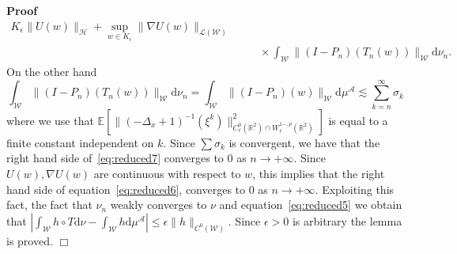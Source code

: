 \documentclass[a4paper,10pt]{article}
\newcommand{\mathd}{\mathrm{d}}
\newenvironment{proof}{\noindent\textbf{Proof\ }}{\hspace*{\fill}$\Box$\medskip}
\begin{document}
\begin{proof}
\begin{eqnarray}
{    K_{\epsilon}} \| U (w) \|_{\mathcal{H}} + \sup_{w \in K_{\epsilon}} \|
    \nabla U (w) \|_{\mathcal{L} (\mathcal{W})} \nonumber\\
    &  & \quad \times \int_{\mathcal{W}} \| (I - P_n) (T_n (w))
    \|_{\mathcal{W}} \mathd \nu_n .  \label{eq:reduced6}
  \end{eqnarray}
  On the other hand
  \begin{equation}
    \int_{\mathcal{W}} \| (I - P_n) (T_n (w)) \|_{\mathcal{W}} \mathd \nu_n =
    \int_{\mathcal{W}} \| (I - P_n) (w) \|_{\mathcal{W}} \mathd
    \mu^{\mathcal{A}} \lesssim \sum_{k = n}^{\infty} \sigma_k
    \label{eq:reduced7}
  \end{equation}
  where we use that $\mathbb{E} [\| (- \Delta_x + 1)^{- 1} (\xi^k)
  \|^2_{C^0_{\ell} (\mathbb{R}^2) \cap W^{1 -, p}_{\ell} (\mathbb{R}^2)}]$ is
  equal to a finite constant independent on $k$. Since $\sum \sigma_k$ is
  convergent, we have that the right hand side of~{\eqref{eq:reduced7}}
  converges to 0 as $n \rightarrow + \infty$. Since $U (w), \nabla U (w)$ are
  continuous with respect to $w$, this implies that the right hand side of
  equation~{\eqref{eq:reduced6}}, converges to 0 as $n \rightarrow + \infty$.
  Exploiting this fact, the fact that $\nu_n$ weakly converges to $\nu$ and
  equation~{\eqref{eq:reduced5}} we obtain that $\left| \int_{\mathcal{W}} h
  \circ T \mathd \nu - \int_{\mathcal{W}} h \mathd \mu^{\mathcal{A}} \right|
  \leqslant \epsilon \| h \|_{C^0 (\mathcal{W})}$. Since $\epsilon > 0$ is
  arbitrary the lemma is proved.
\end{proof}
\end{document}
